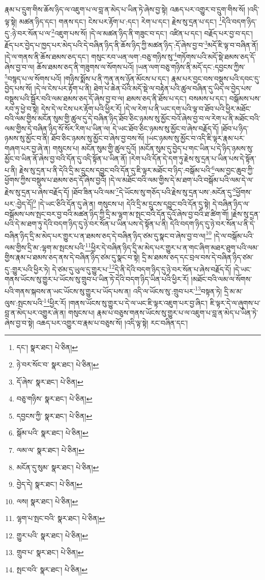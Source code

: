 རྣམ་པ་དྲུག་གིས་ཆོས་ཉིད་ལ་འཇུག་པ་ལ་བླ་ན་མེད་པ་ཡིན་ཏེ་ཞེས་བྱ་སྟེ། འཆད་པར་འགྱུར་བ་དྲུག་གིས་སོ། །འདི་ལྟ་སྟེ། མཚན་ཉིད་དང་། གནས་དང་། ངེས་པར་རྟོག་པ་:དང་། རེག་པ་དང་། རྗེས་སུ་དྲན་པ་དང་། \footnote{དང་།    སྣར་ཐང་།  པེ་ཅིན། }དེའི་བདག་ཉིད་དུ་:ཉེ་བར་སོན་པ་ལ་\footnote{ཉེ་བར་སོང་བ་  སྣར་ཐང་།  པེ་ཅིན། }འཇུག་པས་སོ། །དེ་ལ་མཚན་ཉིད་ནི་གཟུང་བ་དང་། འཛིན་པ་དང་། བརྗོད་པར་བྱ་བ་དང་། རྗོད་པར་བྱེད་པ་ཁྱད་པར་མེད་པའི་དེ་བཞིན་ཉིད་ནི་ཆོས་ཉིད་ཀྱི་མཚན་ཉིད་:དོ་ཞེས་བྱ་བ་\footnote{དོ་ཞེས་  སྣར་ཐང་།  པེ་ཅིན། }མདོ་ཇི་ལྟ་བ་བཞིན་ནོ། །དེ་ལ་གནས་ནི་ཆོས་ཐམས་ཅད་དང་། གསུང་རབ་ཡན་ལག་:བཅུ་གཉིས་སུ་\footnote{བཅུ་གཉིས་  སྣར་ཐང་།  པེ་ཅིན། }གཏོགས་པའི་མདོ་སྡེ་ཐམས་ཅད་དོ་ཞེས་བྱ་བ་ལ། ཆོས་ཐམས་ཅད་ནི་གཟུགས་ལ་སོགས་པའོ། །ཡན་ལག་བཅུ་གཉིས་ནི་མདོ་དང་:དབྱངས་ཀྱིས་\footnote{དབྱངས་ཀྱི་  སྣར་ཐང་།  པེ་ཅིན། }བསྙད་པ་ལ་སོགས་པའོ། །གཉིས་སྨོས་པ་ནི་ཀུན་ནས་ཉོན་མོངས་པ་དང་། རྣམ་པར་བྱང་བས་བསྡུས་པའི་དབང་དུ་བྱེད་པས་སོ། །དེ་ལ་ངེས་པར་རྟོག་པ་ནི། ཐེག་པ་ཆེན་པོའི་མདོ་སྡེ་ལ་བརྟེན་པའི་ཚུལ་བཞིན་དུ་ཡིད་ལ་བྱེད་པས་བསྡུས་པའི་སྦྱོར་བའི་ལམ་ཐམས་ཅད་དོ་ཞེས་བྱ་བ་ལ། ཐམས་ཅད་ནི་ཐོས་པ་དང་། བསམས་པ་དང་། བསྒོམས་པས་རབ་ཏུ་ཕྱེ་བ་སྟེ། དེས་དེ་ལ་ངེས་པར་རྟོག་པའི་ཕྱིར་རོ། །དེ་ལ་རེག་པ་ནི་ཡང་དག་པའི་ལྟ་བ་ཐོབ་པའི་ཕྱིར་མཐོང་བའི་ལམ་གྱིས་མངོན་སུམ་གྱི་ཚུལ་དུ་དེ་བཞིན་ཉིད་ཐོབ་ཅིང་ཉམས་སུ་མྱོང་བའོ་ཞེས་བྱ་བ་ལ་རེག་པ་ནི་མཐོང་བའི་ལམ་གྱིས་དེ་བཞིན་ཉིད་སོ་སོར་རིག་པ་ཡིན་ལ། དེ་ཡང་ཐོབ་ཅིང་ཉམས་སུ་མྱོང་བ་ཞེས་བརྗོད་དོ། །ཐོབ་པ་ཉིད་ཉམས་སུ་མྱོང་བ་ནི། ཐོབ་ཅིང་ཉམས་སུ་མྱོང་བ་ཞེས་བྱ་བས་སོ། །ཡང་ཉམས་སུ་མྱོང་བ་འདི་ཇི་ལྟར་རྣམ་པར་གཞག་པར་བྱ་ཞེ་ན། གསུངས་པ། མངོན་སུམ་གྱི་ཚུལ་དུའོ། །མངོན་སུམ་དུ་བྱེད་པ་གང་ཡིན་པ་དེ་ཉིད་ཉམས་སུ་མྱོང་བ་ཡིན་ནོ་ཞེས་བྱ་བའི་དོན་དུ་འདི་སྟོན་པ་ཡིན་ནོ། །རེག་པའི་དོན་དེ་དག་ཏུ་རྗེས་སུ་དྲན་པ་ཡིན་པས་དེ་སྟོན་པ་ནི། རྗེས་སུ་དྲན་པ་ནི་དེའི་དྲི་མ་དྲུངས་དབྱུང་བའི་དོན་དུ་ཇི་ལྟར་མཐོང་བ་ཉིད་:བསྒོམ་པའི་\footnote{སྒོམ་པའི་  སྣར་ཐང་།  པེ་ཅིན། }ལམ་བྱང་ཆུབ་ཀྱི་ཕྱོགས་ཀྱིས་བསྡུས་པ་ཐམས་ཅད་དོ་ཞེས་བྱའོ། །དེ་ལ་མཐོང་བའི་ལམ་གྱིས་དེ་མ་ཐག་པའི་བསྒོམ་པའི་ལམ་དེ་ལ་རྗེས་སུ་དྲན་པ་ཞེས་བརྗོད་དོ། །ཐོབ་ཟིན་པའི་ལམ་\footnote{ལམ་ལ་  སྣར་ཐང་།  པེ་ཅིན། }དེ་ཡོངས་སུ་གཅོད་པའི་རྗེས་སུ་དྲན་པས་:མངོན་དུ་\footnote{མངོན་དུ་སུམ་  སྣར་ཐང་།  པེ་ཅིན། }ཕྱོགས་པར་:བྱེད་དོ།\footnote{བྱེད་དེ།  སྣར་ཐང་།  པེ་ཅིན། } །དེ་ཡང་ཅིའི་དོན་དུ་ཞེ་ན། གསུངས་པ། དེའི་དྲི་མ་དྲུངས་དབྱུང་བའི་དོན་དུ་སྟེ། དེ་བཞིན་ཉིད་ལ་བསྒོམས་པས་སྤང་བར་བྱ་བའི་མཚན་ཉིད་ཀྱི་དྲི་མ་ལྷག་མ་སྤང་བའི་དོན་དུའོ་ཞེས་བྱ་བའི་ཐ་ཚིག་གོ། །རྗེས་སུ་དྲན་པའི་དེ་མ་ཐག་ཏུ་དེའི་བདག་ཉིད་དུ་ཉེ་བར་སོན་པ་ཡིན་པས་དེ་སྟོན་པ་ནི། དེའི་བདག་ཉིད་དུ་ཉེ་བར་སོན་པ་ནི་དེ་བཞིན་ཉིད་དྲི་མ་མེད་པར་གྱུར་པ་ན་ཐམས་ཅད་དེ་བཞིན་ཉིད་ཙམ་དུ་སྣང་བ་ཞེས་བྱ་བ་ལ།\footnote{ལས།  སྣར་ཐང་།  པེ་ཅིན། } །དེ་ལ་བསྒོམ་པའི་ལམ་གྱིས་དྲི་མ་:ལྷག་མ་སྤངས་པའི་\footnote{ལྷག་པ་སྤང་བའི་  སྣར་ཐང་།  པེ་ཅིན། }ཕྱིར་དེ་བཞིན་ཉིད་དྲི་མ་མེད་པར་གྱུར་པ་ན་གང་ཞིག་མཐར་ཐུག་པའི་ལམ་གྱིས་རྣམ་པ་ཐམས་ཅད་ནས་དེ་བཞིན་ཉིད་ཙམ་དུ་སྣང་བ་སྟེ། དྲི་མ་ཐམས་ཅད་དང་བྲལ་བས་དེ་བཞིན་ཉིད་ཙམ་དུ་:གྱུར་པའི་ཕྱིར་ཏེ། དེ་ཙམ་དུ་ཡུལ་དུ་གྱུར་པ་\footnote{གྱུར་པའི་  སྣར་ཐང་།  པེ་ཅིན། }དེ་ནི་དེའི་བདག་ཉིད་དུ་ཉེ་བར་སོན་པ་ཞེས་བརྗོད་དོ། །དེ་ཡང་གནས་ཡོངས་སུ་གྱུར་པ་ཡོངས་སུ་གྲུབ་པ་ཡིན་ཏེ་དེའི་བདག་ཉིད་ཡིན་པའི་ཕྱིར་རོ། །མཐོང་བའི་ལམ་ལ་སོགས་པའི་གནས་སྐབས་ན་ཡང་ཡོངས་སུ་གྱུར་པ་ཡོད་པས་ན། འདི་ལ་ཡོངས་སུ་:གྲུབ་པར་\footnote{གྲུབ་པ་  སྣར་ཐང་།  པེ་ཅིན། }བསྟན་ཏེ། དྲི་མ་མ་ལུས་:སྤངས་པའི་\footnote{སྤང་བའི་  སྣར་ཐང་།  པེ་ཅིན། }ཕྱིར་རོ། །གནས་ཡོངས་སུ་གྱུར་པ་དེ་ལ་ཡང་ཇི་ལྟར་འཇུག་པར་བྱ་ཞིང་། ཇི་ལྟར་དེ་ལ་ཞུགས་པ་བླ་ན་མེད་པར་འགྱུར་ཞེ་ན། གསུངས་པ། རྣམ་པ་བཅུས་གནས་ཡོངས་སུ་གྱུར་པ་ལ་འཇུག་པ་བླ་ན་མེད་པ་ཡིན་ཏེ་ཞེས་བྱ་བ་སྟེ། འཆད་པར་འགྱུར་བ་རྣམ་པ་བཅུས་སོ། །འདི་ལྟ་སྟེ། རང་བཞིན་དང་། 